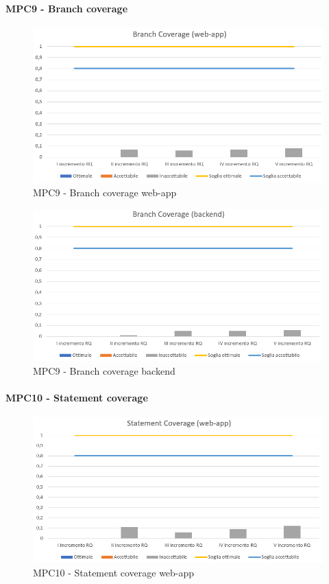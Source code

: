  \newpage
  \paragraph{MPC9 - Branch coverage}
  \begin{figure}[h!]
    \centering
      \includegraphics[scale=1]{Immagini/BranchCov WA.PNG}
    \caption{MPC9 - Branch coverage web-app}
  \end{figure}

  \begin{figure}[h!]
    \centering
      \includegraphics[scale=1]{Immagini/BranchCov BE.PNG}
    \caption{MPC9 - Branch coverage backend}
  \end{figure}



  \newpage
  \paragraph{MPC10 - Statement coverage}
  \begin{figure}[h!]
    \centering
      \includegraphics[scale=1]{Immagini/StatCov WA.PNG}
    \caption{MPC10 - Statement coverage web-app}
  \end{figure}


